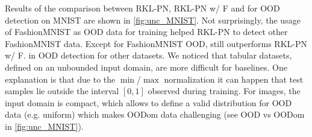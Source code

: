 \begin{table}[H]
    \caption{Results on MNIST for OOD detection against KMNIST (K.) and FashionMNIST (F.). We trained Rev. KL divergence PriorNets with uniform noise (RKL-PN) and Fashion MNIST (RKL-PN w/ F.) as OOD. \PostNetacro requires no OOD data. Larger numbers are better.}
    \label{fig:unc_MNIST}
\end{table}

Results of the comparison between RKL-PN, RKL-PN w/ F and \PostNetacro for OOD detection on MNIST are shown in \cref{fig:unc_MNIST}. Not surprisingly, the usage of FashionMNIST as OOD data for training helped RKL-PN to detect other FashionMNIST data. Except for FashionMNIST OOD, \PostNetacro still outperforms RKL-PN w/ F. in OOD detection for other datasets. We noticed that tabular datasets, defined on an unbounded input domain, are more difficult for baselines. One explanation is that due to the $\min$/$\max$ normalization it can happen that test samples lie outside the interval $[0,1]$ observed during training. For images, the input domain is compact, which allows to define a valid distribution for OOD data (e.g. uniform) which makes OODom data challenging (see OOD vs OODom in \cref{fig:unc_MNIST}).

